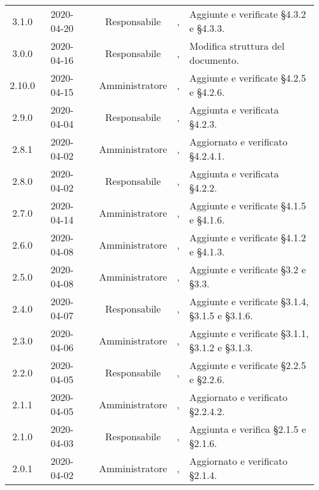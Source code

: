 {\begin{longtable}{ c c  C{2.3cm} c C{3cm} C{3.2cm}}
3.1.0 & 2020-04-20 & \LD{} & Responsabile &  \AT{}, \PF{} & Aggiunte e verificate §4.3.2 e §4.3.3.  \\

3.0.0 & 2020-04-16 & \DF{} & Responsabile &  \AT{}, \PF{} & Modifica struttura del documento.  \\

2.10.0 & 2020-04-15 & \BR{} & Amministratore &  \AT{}, \PF{} & Aggiunte e verificate §4.2.5 e §4.2.6.  \\

2.9.0 & 2020-04-04 & \LD{} & Responsabile &  \AT{}, \PF{} & Aggiunta e verificata  §4.2.3.  \\

2.8.1 & 2020-04-02 & \SE{} & Amministratore &  \AT{}, \PF{} & Aggiornato e verificato §4.2.4.1.  \\

2.8.0 & 2020-04-02 & \LD{} & Responsabile &  \AT{}, \PF{} & Aggiunta e verificata §4.2.2.  \\

2.7.0 & 2020-04-14 & \SE{} & Amministratore &  \AT{}, \PF{} & Aggiunte e verificate §4.1.5 e §4.1.6.  \\

2.6.0 & 2020-04-08 & \BR{} & Amministratore &  \AT{}, \PF{} & Aggiunte e verificate §4.1.2 e §4.1.3.  \\

2.5.0 & 2020-04-08 & \SE{} & Amministratore &  \AT{}, \PF{} & Aggiunte e verificate §3.2 e §3.3.  \\

2.4.0 & 2020-04-07 & \LD{} & Responsabile &  \AT{}, \PF{} & Aggiunte e verificate §3.1.4, §3.1.5 e §3.1.6.  \\

2.3.0 & 2020-04-06 & \SE{} & Amministratore &  \AT{}, \PF{} & Aggiunte e verificate §3.1.1, §3.1.2 e §3.1.3.  \\

2.2.0 & 2020-04-05 & \LD{} & Responsabile &  \AT{}, \PF{} & Aggiunte e verificate §2.2.5 e §2.2.6.  \\

2.1.1 & 2020-04-05 & \BR{} & Amministratore &  \AT{}, \PF{} & Aggiornato e verificato §2.2.4.2.  \\

2.1.0 & 2020-04-03 & \LD{} & Responsabile &  \AT{}, \PF{} & Aggiunta e verifica §2.1.5 e §2.1.6.  \\

2.0.1 & 2020-04-02 & \SE{} & Amministratore &  \AT{}, \PF{} & Aggiornato e verificato §2.1.4.  \\


\end{longtable}}
